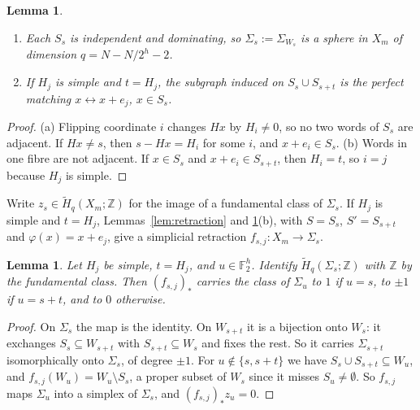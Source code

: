 \documentclass[11pt]{amsart}
\newtheorem{lemma}[theorem]{Lemma}
\theoremstyle{definition}
\theoremstyle{remark}
\newcommand{\F}{\mathbb{F}}
\newcommand{\Z}{\mathbb{Z}}
\newcommand{\Hred}{\widetilde{H}}
\begin{document}
\begin{lemma}\label{lem:fibres}
\begin{enumerate}
\item[(a)] Each $S_s$ is independent and dominating, so $\Sigma_s:=\Sigma_{W_s}$ is a sphere in $X_m$ of dimension
$q=N-N/2^h-2$.
\item[(b)] If $H_j$ is simple and $t=H_j$, the subgraph induced on $S_s\cup S_{s+t}$ is the perfect matching
$x\leftrightarrow x+e_j$, $x\in S_s$.
\end{enumerate}
\end{lemma}

\begin{proof}
(a) Flipping coordinate $i$ changes $Hx$ by $H_i\ne0$, so no two words of $S_s$ are adjacent. If $Hx\ne s$, then
$s-Hx=H_i$ for some $i$, and $x+e_i\in S_s$. (b) Words in one fibre are not adjacent. If $x\in S_s$ and $x+e_i\in
S_{s+t}$, then $H_i=t$, so $i=j$ because $H_j$ is simple.
\end{proof}

Write $z_s\in\Hred_q(X_m;\Z)$ for the image of a fundamental class of $\Sigma_s$. If $H_j$ is simple and $t=H_j$,
Lemmas~\ref{lem:retraction} and \ref{lem:fibres}(b), with $S=S_s$, $S'=S_{s+t}$ and $\varphi(x)=x+e_j$, give a simplicial
retraction $f_{s,j}\colon X_m\to\Sigma_s$.

\begin{lemma}\label{lem:matrix}
Let $H_j$ be simple, $t=H_j$, and $u\in\F_2^h$. Identify $\Hred_q(\Sigma_s;\Z)$ with $\Z$ by the fundamental class. Then $(f_{s,j})_*$ carries the class of
$\Sigma_u$ to $1$ if $u=s$, to $\pm1$ if $u=s+t$, and to $0$ otherwise.
\end{lemma}

\begin{proof}
On $\Sigma_s$ the map is the identity. On $W_{s+t}$ it is a bijection onto $W_s$: it exchanges $S_s\subseteq W_{s+t}$
with $S_{s+t}\subseteq W_s$ and fixes the rest. So it carries $\Sigma_{s+t}$ isomorphically onto $\Sigma_s$, of degree
$\pm1$. For $u\notin\{s,s+t\}$ we have $S_s\cup S_{s+t}\subseteq W_u$, and $f_{s,j}(W_u)=W_u\setminus S_s$, a proper
subset of $W_s$ since it misses $S_u\ne\emptyset$. So $f_{s,j}$ maps $\Sigma_u$ into a simplex of $\Sigma_s$, and
$(f_{s,j})_*z_u=0$.
\end{proof}
\end{document}
